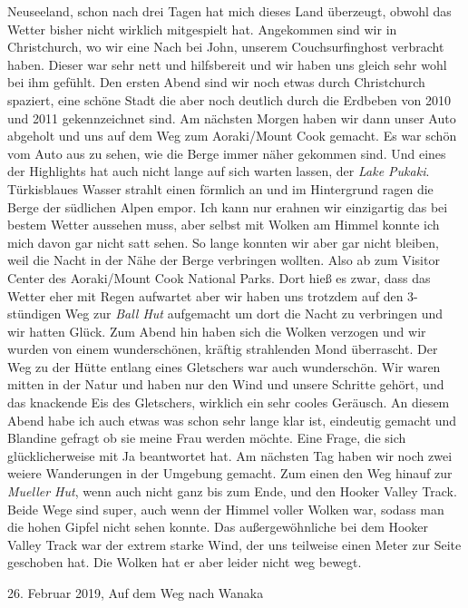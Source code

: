 \documentclass[11pt]{book}
\begin{document}
Neuseeland, schon nach drei Tagen hat mich dieses Land überzeugt, obwohl das Wetter bisher nicht wirklich mitgespielt hat. Angekommen 
sind wir in Christchurch, wo wir eine Nach bei John, unserem Couchsurfinghost verbracht haben. Dieser war sehr nett und hilfsbereit 
und wir haben uns gleich sehr wohl bei ihm gefühlt. Den ersten Abend sind wir noch etwas durch Christchurch spaziert, eine schöne 
Stadt die aber noch deutlich durch die Erdbeben von 2010 und 2011 gekennzeichnet sind. Am nächsten Morgen haben wir dann unser Auto 
abgeholt und uns auf dem Weg zum Aoraki/Mount Cook gemacht. Es war schön vom Auto aus zu sehen, wie die Berge immer näher gekommen sind. 
Und eines der Highlights hat auch nicht lange auf sich warten lassen, der \emph{Lake Pukaki}. Türkisblaues Wasser strahlt einen förmlich 
an und im Hintergrund ragen die Berge der südlichen Alpen empor. Ich kann nur erahnen wir einzigartig das bei bestem Wetter aussehen muss, 
aber selbst mit Wolken am Himmel konnte ich mich davon gar nicht satt sehen. So lange konnten wir aber gar nicht bleiben, weil die Nacht in der
Nähe der Berge verbringen wollten. Also ab zum Visitor Center des Aoraki/Mount Cook National Parks. Dort hieß es zwar, dass das Wetter 
eher mit Regen aufwartet aber wir haben uns trotzdem auf den 3-stündigen Weg zur \emph{Ball Hut} aufgemacht um dort die Nacht zu 
verbringen und wir hatten Glück. Zum Abend hin haben sich die Wolken verzogen und wir wurden von einem wunderschönen, kräftig strahlenden 
Mond überrascht. Der Weg zu der Hütte entlang eines Gletschers war auch wunderschön. Wir waren mitten in der Natur und haben nur den Wind 
und unsere Schritte gehört, und das knackende Eis des Gletschers, wirklich ein sehr cooles Geräusch. An diesem Abend habe ich auch 
etwas was schon sehr lange klar ist, eindeutig gemacht und Blandine gefragt ob sie meine Frau werden möchte. Eine Frage, die sich 
glücklicherweise mit Ja beantwortet hat. Am nächsten Tag haben wir noch zwei weiere Wanderungen in der Umgebung gemacht. Zum einen den Weg 
hinauf zur \emph{Mueller Hut}, wenn auch nicht ganz bis zum Ende, und den Hooker Valley Track. Beide Wege sind super, auch wenn der Himmel 
voller Wolken war, sodass man die hohen Gipfel nicht sehen konnte. Das außergewöhnliche bei dem Hooker Valley Track war der extrem 
starke Wind, der uns teilweise einen Meter zur Seite geschoben hat. Die Wolken hat er aber leider nicht weg bewegt. 

26. Februar 2019, Auf dem Weg nach Wanaka
\end{document}
